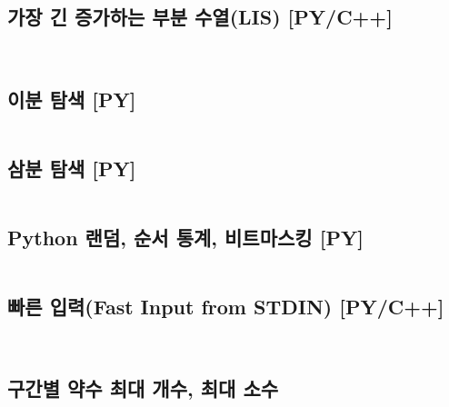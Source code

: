 \documentclass[landscape,8pt,a4paper,twocolumn]{extarticle}
\begin{document}
\subsection{가장 긴 증가하는 부분 수열(LIS) [PY/C++]}
\inputminted{python}{python/Misc/LIS.py}
\inputminted{cpp}{mixed/cpp/Misc/LIS.hpp}
\subsection{이분 탐색 [PY]}
\inputminted{python}{python/Misc/BinarySearch.py}
\subsection{삼분 탐색 [PY]}
\inputminted{python}{python/Misc/TernarySearch.py}
\subsection{Python 랜덤, 순서 통계, 비트마스킹 [PY]}
\inputminted{python}{python/Misc/Cpp-Grammer.py}
\subsection{빠른 입력(Fast Input from STDIN) [PY/C++]}
\inputminted{python}{python/Misc/FastIO.py}
\inputminted{cpp}{mixed/cpp/Misc/FastIO.hpp}
\subsection{구간별 약수 최대 개수, 최대 소수}
\inputminted[fontsize=\scriptsize]{text}{docs/NUMBER_TABLES.txt}
\end{document}
